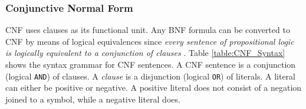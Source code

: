 \subsubsection{Conjunctive Normal Form}
\label{subsubsec:CNF}

CNF uses clauses as its functional unit. Any BNF formula can be converted to CNF by means of logical equivalences since \textit{every sentence of propositional logic is logically equivalent to a conjunction of clauses} \citep{russell2016artificial}. Table \ref{table:CNF_Syntax} shows the syntax grammar for CNF sentences. A CNF sentence is a conjunction (logical \texttt{AND}) of clauses. A \textit{clause} is a disjunction (logical \texttt{OR}) of literals. A literal can either be positive or negative. A positive literal does not consist of a negation joined to a symbol, while a negative literal does.


